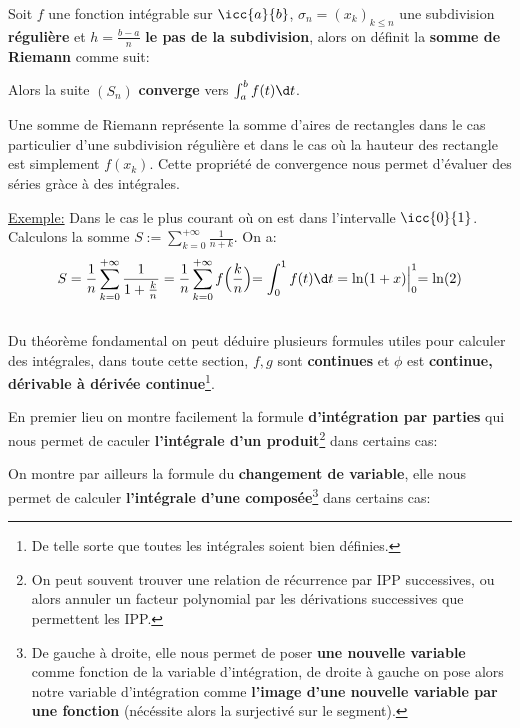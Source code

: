 Soit \(f\) une fonction intégrable sur \(\icc{a}{b}\), \(\sigma_n = (x_k)_{k \leq n}\) une subdivision \textbf{régulière} et \(h = \frac{b - a}{n}\) \textbf{le pas de la subdivision}, alors on définit la \textbf{somme de Riemann} comme suit:

Alors la suite \((S_n)\) \textbf{converge} vers \(\int_{a}^{b} f(t) \d t\).\<

Une somme de Riemann représente la somme d'aires de rectangles dans le cas particulier d'une subdivision régulière et dans le cas où la hauteur des rectangle est simplement \(f(x_k)\). Cette propriété de convergence nous permet d'évaluer des séries gràce à des intégrales.\<

\underline{Exemple:} Dans le cas le plus courant où on est dans l'intervalle \(\icc{0}{1}\). Calculons la somme \(S := \sum_{k=0}^{+\infty} \frac{1}{n + k}\). On a:
\[
   S =  \frac{1}{n}\sum_{k=0}^{+\infty} \frac{1}{1 + \frac{k}{n}} = \frac{1}{n}\sum_{k=0}^{+\infty} f\Bigl(\frac{k}{n}\Bigl) = \int_{0}^{1} f(t) \d t = \ln(1 + x) \Bigl|_{0}^{1} = \ln(2)
\]

\subsection*{}

Du théorème fondamental on peut déduire plusieurs formules utiles pour calculer des intégrales, dans toute cette section, \(f, g\) sont \textbf{continues} et \(\phi\) est \textbf{continue, dérivable à dérivée continue}\footnote[3]{De telle sorte que toutes les intégrales soient bien définies.}.\< 

En premier lieu on montre facilement la formule \textbf{d'intégration par parties} qui nous permet de caculer \textbf{l'intégrale d'un produit}\footnote[4]{On peut souvent trouver une relation de récurrence par IPP successives, ou alors annuler un facteur polynomial par les dérivations successives que permettent les IPP.} dans certains cas:

On montre par ailleurs la formule du \textbf{changement de variable}, elle nous permet de calculer \textbf{l'intégrale d'une composée}\footnote[5]{De gauche à droite, elle nous permet de poser \textbf{une nouvelle variable} comme fonction de la variable d'intégration, de droite à gauche on pose alors notre variable d'intégration comme \textbf{l'image d'une nouvelle variable par une fonction} (nécéssite alors la surjectivé sur le segment).} dans certains cas:


